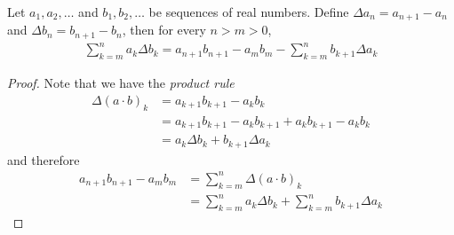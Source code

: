 \begin{lem}\label{SummationByParts}Let $a_1, a_2, \dots$ and $b_1,
  b_2, \dots$ be sequences of real numbers.  Define $\Delta a_n =
  a_{n+1} - a_n$ and $\Delta b_n =
  b_{n+1} - b_n$, then for every $n > m > 0$,
\begin{align*}
\sum_{k=m}^n a_k \Delta b_k = a_{n+1} b_{n+1} - a_m b_m - \sum_{k=m}^n
b_{k+1} \Delta a_k
\end{align*}
\end{lem}
\begin{proof}Note that we have the \emph{product rule}
\begin{align*}
\Delta (a\cdot b)_k &= a_{k+1}b_{k+1} - a_k b_k \\
&= a_{k+1}b_{k+1} -
a_{k}b_{k+1} + a_{k}b_{k+1} - a_k b_k \\
&= a_k \Delta b_k +
b_{k+1} \Delta a_k
\end{align*}
and therefore 
\begin{align*}
a_{n+1} b_{n+1} - a_m b_m &= \sum_{k=m}^n \Delta (a\cdot b)_k  \\
&= \sum_{k=m}^n a_k \Delta b_k  + \sum_{k=m}^n b_{k+1} \Delta a_k
\end{align*}
\end{proof}

